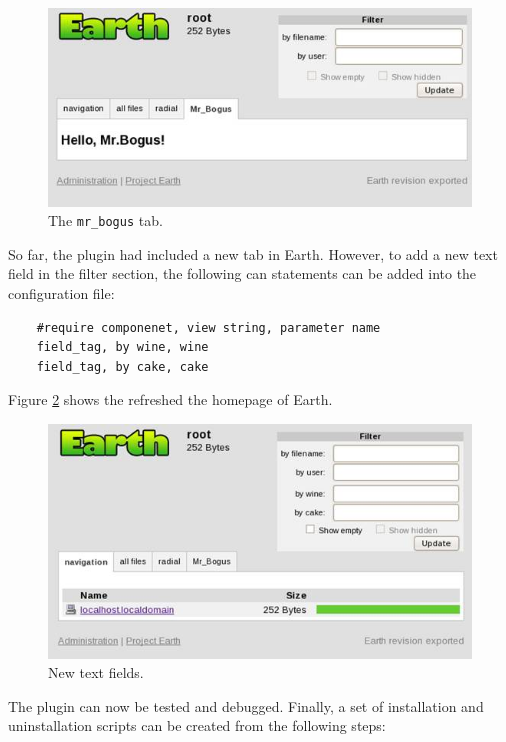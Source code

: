 \documentclass{article}
\begin{document}
\begin{figure}
\centering
\includegraphics[scale=0.5]{fig/instruction-7.jpg}
\caption{The \texttt{mr\_bogus} tab.}
\label{fig:instruction-7}
\end{figure}

So far, the plugin had included a new tab in Earth. However, to add a new text field in the filter section, the following can statements can be added into the configuration file:

\begin{verbatim}
    #require componenet, view string, parameter name
    field_tag, by wine, wine
    field_tag, by cake, cake
\end{verbatim}

Figure \ref{fig:instruction-9} shows the refreshed the homepage of Earth.

\begin{figure}
    \centering
    \includegraphics[scale=0.5]{fig/instruction-9.jpg}
    \caption{New text fields.}
    \label{fig:instruction-9}
\end{figure}

The plugin can now be tested and debugged. Finally, a set of installation and uninstallation scripts can be created from the following steps:
\end{document}
